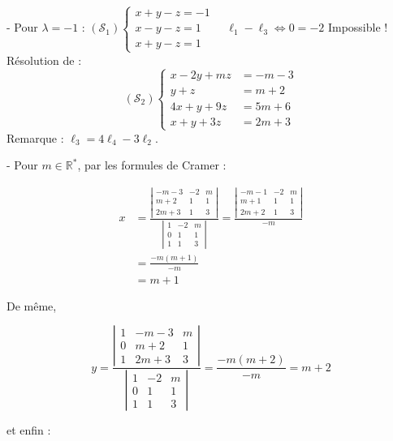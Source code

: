 {{- Pour $\lambda=-1$ :
$\left(\mathcal{S}_1\right)\left\{\begin{array}{l}x+y-z=-1 \\ x-y-z=1 \\ x+y-z=1\end{array} \quad \ell_1-\ell_3 \Leftrightarrow 0=-2\right.$ Impossible !
Résolution de :
$$
\left(\mathcal{S}_2\right)\left\{\begin{aligned}
x-2 y+m z & =-m-3 \\
y+z & =m+2 \\
4 x+y+9 z & =5 m+6 \\
x+y+3 z & =2 m+3
\end{aligned}\right.
$$
Remarque : $\ell_3=4 \ell_4-3 \ell_2$.

- Pour $m \in \mathbb{R}^*$, par les formules de Cramer :

$$
\begin{aligned}
x & =\frac{\left|\begin{array}{ccc}
-m-3 & -2 & m \\
m+2 & 1 & 1 \\
2 m+3 & 1 & 3
\end{array}\right|}{\left|\begin{array}{ccc}
1 & -2 & m \\
0 & 1 & 1 \\
1 & 1 & 3
\end{array}\right|}=\frac{\left|\begin{array}{ccc}
-m-1 & -2 & m \\
m+1 & 1 & 1 \\
2 m+2 & 1 & 3
\end{array}\right|}{-m} \\
& =\frac{-m(m+1)}{-m} \\
& =m+1
\end{aligned}
$$

De même, 

$$y = 
\frac{\left|\begin{array}{ccc}
1 & -m-3 & m \\
0 & m+2 & 1 \\
1 & 2 m+3 & 3
\end{array}\right|}{\left|\begin{array}{ccc}
1 & -2 & m \\
0 & 1 & 1 \\
1 & 1 & 3
\end{array}\right|} =\frac{-m(m+2)}{-m} = m+2 
$$

et enfin : 

}}
